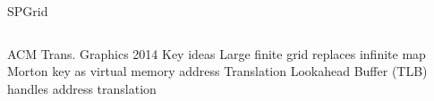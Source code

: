 \begin{frame}{SPGrid}
\begin{columns}
\begin{outline}
    \1 ACM Trans. Graphics 2014 \cite{Setaluri2014}
    \1 Key ideas
      \2 Large finite grid replaces infinite map
      \2 Morton key as virtual memory address
      \2 Translation Lookahead Buffer (TLB) handles address translation
\end{outline}
\centering
{}
\vspace{0.5cm}
\end{columns}
\end{frame}
